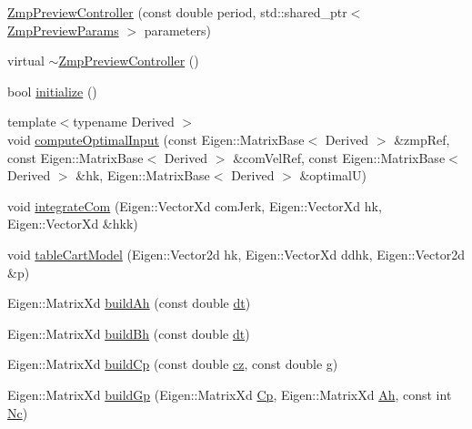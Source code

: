 \begin{DoxyCompactItemize}
\item 
\hyperlink{classZmpPreviewController_a26b5bd0bdd476f70c2009d77d5495b24}{\-Zmp\-Preview\-Controller} (const double period, std\-::shared\-\_\-ptr$<$ \hyperlink{structZmpPreviewParams}{\-Zmp\-Preview\-Params} $>$ parameters)
\item 
virtual \hyperlink{classZmpPreviewController_af702c45f318c7a78310d19cc061886dd}{$\sim$\-Zmp\-Preview\-Controller} ()
\item 
bool \hyperlink{classZmpPreviewController_ac28287e01187bff2cea5a68292d936bd}{initialize} ()
\item 
{\footnotesize template$<$typename Derived $>$ }\\void \hyperlink{classZmpPreviewController_aabdafde9ecc41a6d98134e0a01083d8a}{compute\-Optimal\-Input} (const \-Eigen\-::\-Matrix\-Base$<$ \-Derived $>$ \&zmp\-Ref, const \-Eigen\-::\-Matrix\-Base$<$ \-Derived $>$ \&com\-Vel\-Ref, const \-Eigen\-::\-Matrix\-Base$<$ \-Derived $>$ \&hk, \-Eigen\-::\-Matrix\-Base$<$ \-Derived $>$ \&optimal\-U)
\item 
void \hyperlink{classZmpPreviewController_abbf80c91182c5e41ce60d3b7430a583e}{integrate\-Com} (\-Eigen\-::\-Vector\-Xd com\-Jerk, \-Eigen\-::\-Vector\-Xd hk, \-Eigen\-::\-Vector\-Xd \&hkk)
\item 
void \hyperlink{classZmpPreviewController_a7d559ce7ece62627b58f20cd01c9ce30}{table\-Cart\-Model} (\-Eigen\-::\-Vector2d hk, \-Eigen\-::\-Vector\-Xd ddhk, \-Eigen\-::\-Vector2d \&p)
\item 
\-Eigen\-::\-Matrix\-Xd \hyperlink{classZmpPreviewController_a39ffdba07960f90a6cce247065f12504}{build\-Ah} (const double \hyperlink{classZmpPreviewController_abf1a3ec8d1698afab1c20bba32b5a724}{dt})
\item 
\-Eigen\-::\-Matrix\-Xd \hyperlink{classZmpPreviewController_a0114a8bdba920b9a7fb6b35e7b90ddd1}{build\-Bh} (const double \hyperlink{classZmpPreviewController_abf1a3ec8d1698afab1c20bba32b5a724}{dt})
\item 
\-Eigen\-::\-Matrix\-Xd \hyperlink{classZmpPreviewController_a716fdc040e5eaf9f6fe00c652f205d73}{build\-Cp} (const double \hyperlink{classZmpPreviewController_a3a317d26cc1bbaf8811491724fdd1def}{cz}, const double \hyperlink{classZmpPreviewController_a344571f012aa58250d7625905681bf1b}{g})
\item 
\-Eigen\-::\-Matrix\-Xd \hyperlink{classZmpPreviewController_af9df60a716648bf74467f7a678c8420b}{build\-Gp} (\-Eigen\-::\-Matrix\-Xd \hyperlink{classZmpPreviewController_a1a63870dcc3d51a26c4adc9c97e650ff}{\-Cp}, \-Eigen\-::\-Matrix\-Xd \hyperlink{classZmpPreviewController_a8ee8ec415e25374f4fa687f5a5a6b9df}{\-Ah}, const int \hyperlink{classZmpPreviewController_af0c8b4aa92a6e3e95f80d81a8c91f693}{\-Nc})

\end{DoxyCompactItemize}
